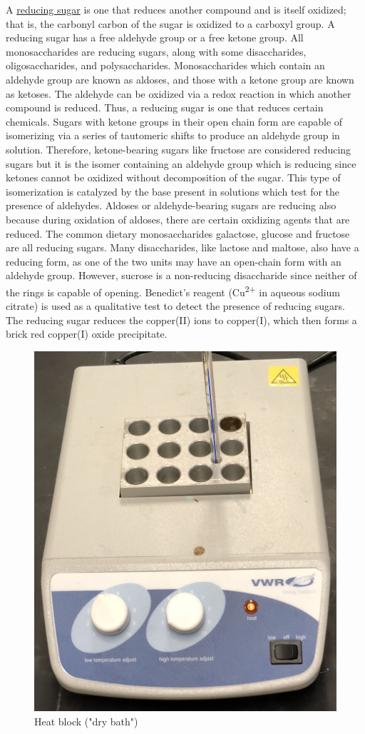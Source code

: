 A \href{https://en.wikipedia.org/wiki/Reducing_sugar}{reducing sugar} is
one that reduces another compound and is itself oxidized; that is, the
carbonyl carbon of the sugar is oxidized to a carboxyl group. A reducing
sugar has a free aldehyde group or a free ketone group. All
monosaccharides are reducing sugars, along with some disaccharides,
oligosaccharides, and polysaccharides. Monosaccharides which contain an
aldehyde group are known as aldoses, and those with a ketone group are
known as ketoses. The aldehyde can be oxidized via a redox reaction in
which another compound is reduced. Thus, a reducing sugar is one that
reduces certain chemicals. Sugars with ketone groups in their open chain
form are capable of isomerizing via a series of tautomeric shifts to
produce an aldehyde group in solution. Therefore, ketone-bearing sugars
like fructose are considered reducing sugars but it is the isomer
containing an aldehyde group which is reducing since ketones cannot be
oxidized without decomposition of the sugar. This type of isomerization
is catalyzed by the base present in solutions which test for the
presence of aldehydes. Aldoses or aldehyde-bearing sugars are reducing
also because during oxidation of aldoses, there are certain oxidizing
agents that are reduced. The common dietary monosaccharides galactose,
glucose and fructose are all reducing sugars. Many disaccharides, like
lactose and maltose, also have a reducing form, as one of the two units
may have an open-chain form with an aldehyde group. However, sucrose is
a non-reducing disaccharide since neither of the rings is capable of
opening. Benedict's reagent (Cu\textsuperscript{2+} in aqueous sodium
citrate) is used as a qualitative test to detect the presence of
reducing sugars. The reducing sugar reduces the copper(II) ions to
copper(I), which then forms a brick red copper(I) oxide precipitate.

\begin{figure}

{\centering \includegraphics[width=0.7\linewidth]{./figures/chem_aspects/Heatblock}

}

\caption{Heat block ("dry bath")}\label{fig:heatblock}
\end{figure}

